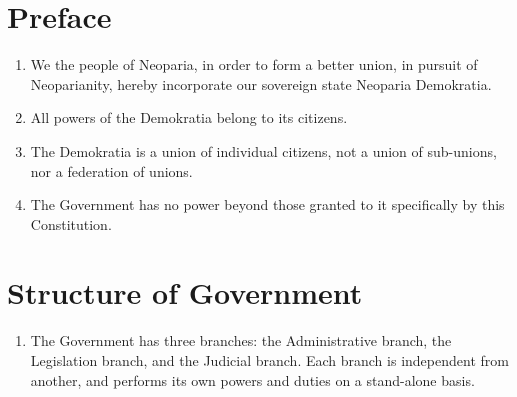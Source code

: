 



\section{Preface}
\begin{enumerate}
    \item We the people of Neoparia, in order to form a better union, in pursuit of Neoparianity, hereby incorporate our sovereign state Neoparia Demokratia.
    \item All powers of the Demokratia belong to its citizens.
    \item The Demokratia is a union of individual citizens, not a union of sub-unions, nor a federation of unions.
    \item The Government has no power beyond those granted to it specifically by this Constitution.
\end{enumerate}

\section{Structure of Government}
\begin{enumerate}[start=101]
    \item The Government has three branches: the Administrative branch, the Legislation branch, and the Judicial branch. Each branch is independent from another, and performs its own powers and duties on a stand-alone basis.
\end{enumerate}

